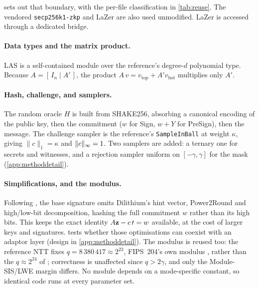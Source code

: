  sets out that boundary, with the per-file classification in
\cref{tab:reuse}. The vendored
\texttt{secp256k1-zkp} \cite{secp256k1zkp} and LaZer \cite{lazer} are also used unmodified.
LaZer is accessed through a dedicated bridge.


\paragraph{Data types and the matrix product.}
LAS is a self-contained module over the reference's degree-$d$ polynomial type. Because
$A=[\,I_n\mid A'\,]$, the product $A\,v = v_{\text{top}} + A' v_{\text{bot}}$ multiplies only
$A'$.

\paragraph{Hash, challenge, and samplers.}
The random oracle $H$ is built from SHAKE256, absorbing a canonical encoding of the public
key, then the commitment ($w$ for Sign, $w+Y$ for PreSign), then the message. The challenge
sampler is the reference's \texttt{SampleInBall} at weight $\kappa$, giving
$\lVert c\rVert_1=\kappa$ and $\lVert c \rVert_\infty=1$. Two samplers are added: a ternary one for
secrets and witnesses, and a rejection sampler uniform on $[-\gamma,\gamma]$ for the mask
(\cref{app:methoddetail}).

\paragraph{Simplifications, and the modulus.}
Following \cite{esgin2020post}, the base signature omits Dilithium's hint vector,
Power2Round and high/low-bit decomposition, hashing the full commitment $w$ rather
than its high bits. This keeps the exact identity $A\mathbf{z} - c\,t = w$ available, at the cost of larger keys and
signatures.  tests whether those optimisations can coexist with an
adaptor layer (design in \cref{app:methoddetail}). The modulus is reused too: the reference NTT fixes
$q=8\,380\,417\approx 2^{23}$, FIPS~204's own modulus \cite{1274601}, rather than the
$q\approx 2^{24}$ of \cite{esgin2020post}; correctness is unaffected since
$q>2\gamma$, and only the Module-SIS/LWE margin differs. No module depends on a
mode-specific constant, so identical code runs at every parameter set.

